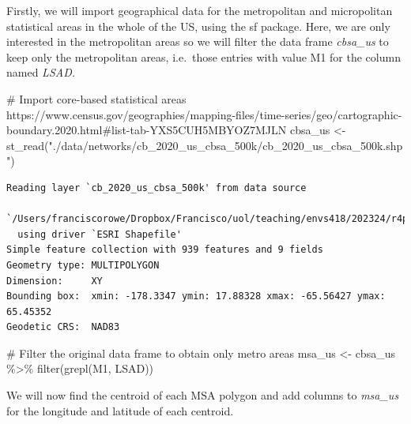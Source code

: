 \documentclass[
  letterpaper,
  DIV=11,
  numbers=noendperiod]{scrreprt}
\newenvironment{Shaded}{\begin{snugshade}}{\end{snugshade}}
\newcommand{\CommentTok}[1]{\textcolor[rgb]{0.37,0.37,0.37}{#1}}
\newcommand{\FunctionTok}[1]{\textcolor[rgb]{0.28,0.35,0.67}{#1}}
\newcommand{\NormalTok}[1]{\textcolor[rgb]{0.00,0.23,0.31}{#1}}
\newcommand{\OtherTok}[1]{\textcolor[rgb]{0.00,0.23,0.31}{#1}}
\newcommand{\SpecialCharTok}[1]{\textcolor[rgb]{0.37,0.37,0.37}{#1}}
\newcommand{\StringTok}[1]{\textcolor[rgb]{0.13,0.47,0.30}{#1}}
\begin{document}
Firstly, we will import geographical data for the metropolitan and
micropolitan statistical areas in the whole of the US, using the sf
package. Here, we are only interested in the metropolitan areas so we
will filter the data frame \emph{cbsa\_us} to keep only the metropolitan
areas, i.e.~those entries with value M1 for the column named
\emph{LSAD.}

\begin{Shaded}
\begin{Highlighting}[]
\CommentTok{\# Import core{-}based statistical areas https://www.census.gov/geographies/mapping{-}files/time{-}series/geo/cartographic{-}boundary.2020.html\#list{-}tab{-}YXS5CUH5MBYOZ7MJLN}
\NormalTok{cbsa\_us }\OtherTok{\textless{}{-}} \FunctionTok{st\_read}\NormalTok{(}\StringTok{"./data/networks/cb\_2020\_us\_cbsa\_500k/cb\_2020\_us\_cbsa\_500k.shp"}\NormalTok{)}
\end{Highlighting}
\end{Shaded}

\begin{verbatim}
Reading layer `cb_2020_us_cbsa_500k' from data source 
  `/Users/franciscorowe/Dropbox/Francisco/uol/teaching/envs418/202324/r4ps/data/networks/cb_2020_us_cbsa_500k/cb_2020_us_cbsa_500k.shp' 
  using driver `ESRI Shapefile'
Simple feature collection with 939 features and 9 fields
Geometry type: MULTIPOLYGON
Dimension:     XY
Bounding box:  xmin: -178.3347 ymin: 17.88328 xmax: -65.56427 ymax: 65.45352
Geodetic CRS:  NAD83
\end{verbatim}

\begin{Shaded}
\begin{Highlighting}[]
\CommentTok{\# Filter the original data frame to obtain only metro areas}
\NormalTok{msa\_us }\OtherTok{\textless{}{-}}\NormalTok{ cbsa\_us }\SpecialCharTok{\%\textgreater{}\%} \FunctionTok{filter}\NormalTok{(}\FunctionTok{grepl}\NormalTok{(}\StringTok{\textquotesingle{}M1\textquotesingle{}}\NormalTok{, LSAD)) }
\end{Highlighting}
\end{Shaded}

We will now find the centroid of each MSA polygon and add columns to
\emph{msa\_us} for the longitude and latitude of each centroid.

\begin{Shaded}
\end{Shaded}
\end{document}
